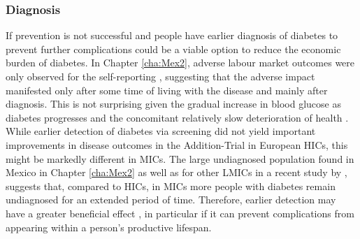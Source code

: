 \subsubsection{Diagnosis}

If prevention is not successful and people have \DIFdelbegin {}\DIFdelend \DIFaddbegin {}\DIFaddend earlier diagnosis of diabetes to prevent further complications could be a viable option to reduce the economic burden of diabetes. In Chapter \ref{cha:Mex2}, adverse labour market outcomes were only observed for the self-reporting \DIFdelbegin {}\DIFdelend \DIFaddbegin {}\DIFaddend , suggesting that the adverse impact manifested only after some time of living with the disease and mainly after diagnosis. This is not surprising given the gradual increase in blood glucose as diabetes progresses and the concomitant relatively slow deterioration of health \parencite{Bertram2010}. While earlier detection of diabetes via screening did not yield important improvements in disease outcomes in the Addition-Trial in European \acp{HIC}, this might be markedly different in \acp{MIC}. The large undiagnosed population found in Mexico in Chapter \ref{cha:Mex2} as well as for other \acp{LMIC} in a recent study by \textcite{Beagley2014}, suggests that, compared to \acp{HIC}, in \acp{MIC} more people with diabetes remain undiagnosed for an extended period of time. Therefore, earlier detection may have a greater beneficial effect  \parencite{Choukem2013}, in particular if it can prevent complications from appearing within a person's productive lifespan. 
\DIFaddbegin 

